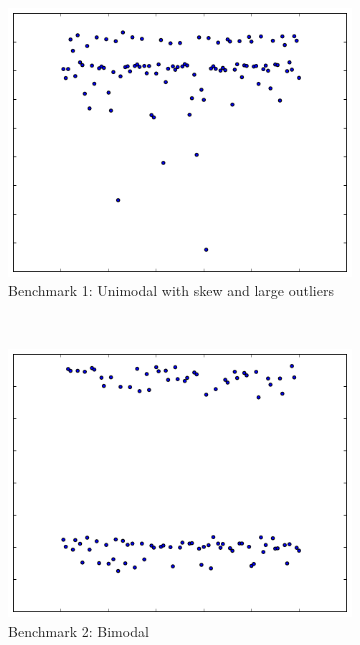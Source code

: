 \documentclass[conference]{IEEEtran}
\begin{document}
\begin{figure}
\centering
\begin{subfigure}{0.22\textwidth}
    \centering
    \includegraphics[width=\textwidth]{figures/fig1/simple_branchsum_fast}
    \caption{Benchmark 1: Unimodal with skew and large outliers}
\end{subfigure}%
~
\begin{subfigure}{0.22\textwidth}
    \centering
    \includegraphics[width=\textwidth]{figures/fig1/bimodal_branchsum}
    \caption{Benchmark 2: Bimodal}
\end{subfigure}
\begin{subfigure}{0.22\textwidth}

\end{subfigure}
\end{figure}
\end{document}
